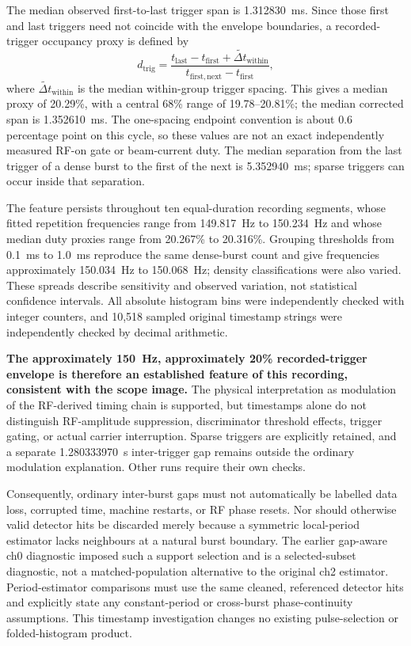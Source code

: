 The median observed first-to-last trigger span is \SI{1.312830}{ms}. Since those first and last triggers need not coincide with the envelope boundaries, a recorded-trigger occupancy proxy is defined by
\begin{equation}
d_{\mathrm{trig}} =
\frac{t_{\mathrm{last}}-t_{\mathrm{first}}+\widetilde{\Delta t}_{\mathrm{within}}}
     {t_{\mathrm{first,next}}-t_{\mathrm{first}}},
\end{equation}
where $\widetilde{\Delta t}_{\mathrm{within}}$ is the median within-group trigger spacing. This gives a median proxy of 20.29\%, with a central 68\% range of 19.78--20.81\%; the median corrected span is \SI{1.352610}{ms}. The one-spacing endpoint convention is about 0.6 percentage point on this cycle, so these values are not an exact independently measured RF-on gate or beam-current duty. The median separation from the last trigger of a dense burst to the first of the next is \SI{5.352940}{ms}; sparse triggers can occur inside that separation.

The feature persists throughout ten equal-duration recording segments, whose fitted repetition frequencies range from \SI{149.817}{Hz} to \SI{150.234}{Hz} and whose median duty proxies range from 20.267\% to 20.316\%. Grouping thresholds from \SI{0.1}{ms} to \SI{1.0}{ms} reproduce the same dense-burst count and give frequencies approximately \SI{150.034}{Hz} to \SI{150.068}{Hz}; density classifications were also varied. These spreads describe sensitivity and observed variation, not statistical confidence intervals. All absolute histogram bins were independently checked with integer counters, and 10,518 sampled original timestamp strings were independently checked by decimal arithmetic.

\textbf{The approximately \SI{150}{Hz}, approximately 20\% recorded-trigger envelope is therefore an established feature of this recording, consistent with the scope image.} The physical interpretation as modulation of the RF-derived timing chain is supported, but timestamps alone do not distinguish RF-amplitude suppression, discriminator threshold effects, trigger gating, or actual carrier interruption. Sparse triggers are explicitly retained, and a separate \SI{1.280333970}{s} inter-trigger gap remains outside the ordinary modulation explanation. Other runs require their own checks.

Consequently, ordinary inter-burst gaps must not automatically be labelled data loss, corrupted time, machine restarts, or RF phase resets. Nor should otherwise valid detector hits be discarded merely because a symmetric local-period estimator lacks neighbours at a natural burst boundary. The earlier gap-aware ch0 diagnostic imposed such a support selection and is a selected-subset diagnostic, not a matched-population alternative to the original ch2 estimator. Period-estimator comparisons must use the same cleaned, referenced detector hits and explicitly state any constant-period or cross-burst phase-continuity assumptions. This timestamp investigation changes no existing pulse-selection or folded-histogram product.

